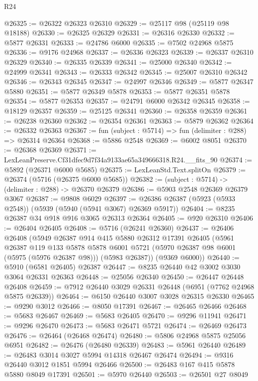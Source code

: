 \begin{lexlean}{R24}
\begin{coremodule}
@26325 := @26322 @26323 @26310
@26329 := @25117 @98 (@25119 @98 @18188)
@26330 := @26325 @26329
@26331 := @26316 @26330
@26332 := @5877 @26331
@26333 := @24786 @6000
@26335 := @7502 @24968 @5875
@26336 := @9176 @24968
@26337 := @26336 @26323
@26339 := @26337 @26310 @26329
@26340 := @26335 @26339
@26341 := @25000 @26340
@26342 := @24999 @26341
@26343 := @26333 @26342
@26345 := @25007 @26310 @26342
@26346 := @26343 @26345
@26347 := @24997 @26346
@26349 := @5877 @26347 @5880
@26351 := @5877 @26349 @5878
@26353 := @5877 @26351 @5878
@26354 := @5877 @26353
@26357 := @24791 @6000 @26342 @26345
@26358 := @18129 @26357
@26359 := @25125 @26341
@26360 := @26358 @26359
@26361 := @26238 @26360
@26362 := @26354 @26361
@26363 := @5879 @26362
@26364 := @26332 @26363
@26367 := fun (subject : @5714) => fun (delimiter : @288) => @26314 @26364
@26368 := @5886 @2548
@26369 := @6002 @8051
@26370 := @26368 @26369
@26371 := LexLeanPreserve.Cf31dfec9d7f34a9133ae65a349666318.R24.__fits_90
@26374 := @5892 (@26371 @6000 @5685)
@26375 := LexLeanStd.Text.splitOn
@26379 := @26374 (@5716 (@26375 @6000 @5685))
@26382 := (subject : @5714) -> (delimiter : @288) -> @26370 @26379
@26386 := @5903 @2548 @26369 @26379 @3067
@26387 := @9808 @6029
@26397 := @26386 @26387 (@5923 (@5933 @2548)) (@5939 (@5940 (@5941 @3067) @26369 @5917))
@26404 := @8235 @26387 @34 @918 @916 @3065 @26313 @26364
@26405 := @920 @26310
@26406 := @26404 @26405
@26408 := @5716 (@26241 @26360)
@26437 := @26406
    @26408
    (@5949
      @26387
      @914
      @415
      @5880
      @26312
      @17391
      @26405
      (@5961
        @26387
        @119
        @133
        @5878
        @5878
        @6001
        @5721
        (@5970 @26387 @98 @6001 (@5975 (@5976 @26387 @98)))
        (@5983 @26387))
      (@9369 @6000))
@26440 := @5910 (@6581 @26405) @26387
@26447 := @8235 @26440 @42 @3002 @3030 @3064 @26331 @26363
@26448 := @25056 @26340
@26450 := @26447 @26448 @26408
@26459 := @7912 @26440 @3029 @26331 @26448 (@6951 (@7762 @24968 @5875 @26339))
@26464 := @6150 @26440 @3007 @3028 @26315 @26330
@26465 := @9290 @3012
@26466 := @8050 @17391
@26467 := @26465 @26466
@26468 := @5683 @26467
@26469 := @5683 @26405
@26470 := @9296 @11941
@26471 := @9296 @26470
@26473 := @5683 @26471 @5721
@26474 := @26469 @26473
@26476 := @26464 (@26468 @26474)
@26480 := @5806 @24968 @5875 @25056 @6951
@26482 := @26476 (@26480 @26339)
@26483 := @5961 @26440
@26489 := @26483 @3014 @3027 @5994 @14318 @26467 @26474
@26494 := @9316 @26440 @3012 @1851 @5994 @26466
@26500 := @26483 @167 @415 @5878 @5880 @8049 @17391
@26501 := @5970 @26440
@26503 := @26501 @27 @8049

\end{coremodule}
\end{lexlean}
